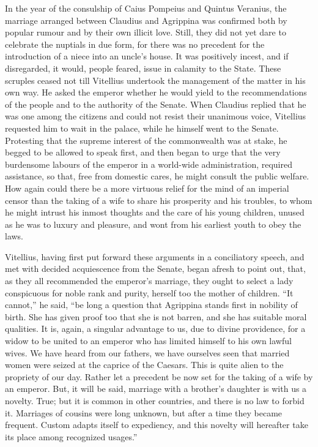 In the year of the consulship of Caius Pompeius and Quintus Veranius, the marriage arranged between Claudius and Agrippina was confirmed both by popular rumour and by their own illicit love. Still, they did not yet dare to celebrate the nuptials in due form, for there was no precedent for the introduction of a niece into an uncle's house. It was positively incest, and if disregarded, it would, people feared, issue in calamity to the State. These scruples ceased not till Vitellius undertook the management of the matter in his own way. He asked the emperor whether he would yield to the recommendations of the people and to the authority of the Senate. When Claudius replied that he was one among the citizens and could not resist their unanimous voice, Vitellius requested him to wait in the palace, while he himself went to the Senate. Protesting that the supreme interest of the commonwealth was at stake, he begged to be allowed to speak first, and then began to urge that the very burdensome labours of the emperor in a world-wide administration, required assistance, so that, free from domestic cares, he might consult the public welfare. How again could there be a more virtuous relief for the mind of an imperial censor than the taking of a wife to share his prosperity and his troubles, to whom he might intrust his inmost thoughts and the care of his young children, unused as he was to luxury and pleasure, and wont from his earliest youth to obey the laws.


Vitellius, having first put forward these arguments in a conciliatory speech, and met with decided acquiescence from the Senate, began afresh to point out, that, as they all recommended the emperor's marriage, they ought to select a lady conspicuous for noble rank and purity, herself too the mother of children. ``It cannot,'' he said, ``be long a question that Agrippina stands first in nobility of birth. She has given proof too that she is not barren, and she has suitable moral qualities. It is, again, a singular advantage to us, due to divine providence, for a widow to be united to an emperor who has limited himself to his own lawful wives. We have heard from our fathers, we have ourselves seen that married women were seized at the caprice of the Caesars. This is quite alien to the propriety of our day. Rather let a precedent be now set for the taking of a wife by an emperor. But, it will be said, marriage with a brother's daughter is with us a novelty. True; but it is common in other countries, and there is no law to forbid it. Marriages of cousins were long unknown, but after a time they became frequent. Custom adapts itself to expediency, and this novelty will hereafter take its place among recognized usages.''

